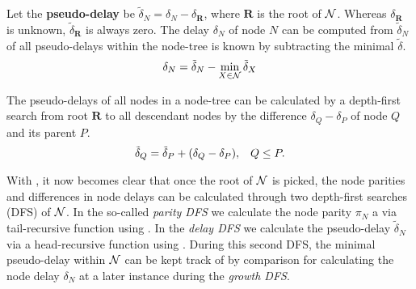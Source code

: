 Let the \textbf{pseudo-delay} be $\tilde{\delta}_N = \delta_N - \delta_\mathbf{R}$, where $\mathbf{R}$ is the root of $\mathcal{N}$. Whereas $\delta_\mathbf{R}$ is unknown, $\tilde{\delta}_\mathbf{R}$ is always zero. The delay $\delta_N$ of node $N$ can be computed from $\tilde{\delta}_N$ of all pseudo-delays within the node-tree is known by subtracting the minimal $\tilde{\delta}$.
\begin{equation}\label{eq:delaypseudo}
  \delta_N = \tilde{\delta}_N - \min_{X \in \mathcal{N}}{\tilde{\delta}_X}
\end{equation}

The pseudo-delays of all nodes in a node-tree can be calculated by a depth-first search from root $\mathbf{R}$ to all descendant nodes by the difference $\delta_Q - \delta_P$ of node $Q$ and its parent $P$. 
\begin{equation}\label{eq:pseudodelay}
    \tilde{\delta}_Q = \tilde{\delta}_P + (\delta_Q - \delta_P), \hspace{.3cm} Q\leq P.
\end{equation}



With , it now becomes clear that once the root of $\mathcal{N}$ is picked, the node parities and differences in node delays can be calculated through two depth-first searches (DFS) of $\mathcal{N}$. In the so-called \emph{parity DFS} we calculate the node parity $\pi_N$ a via tail-recursive function using . In the \emph{delay DFS} we calculate the pseudo-delay $\tilde{\delta}_N$ via a head-recursive function using . During this second DFS, the minimal pseudo-delay within $\mathcal{N}$ can be kept track of by comparison for calculating the node delay $\delta_N$ at a later instance during the \emph{growth DFS}. 

